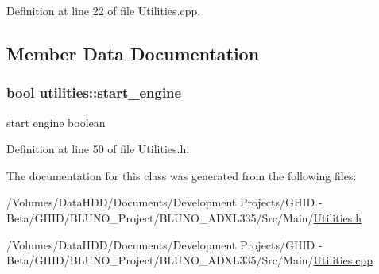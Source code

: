 \-Definition at line 22 of file \-Utilities.\-cpp.



\subsection{\-Member \-Data \-Documentation}
\hypertarget{classutilities_a00ad17c59af67ff895854c2510407513}{
\subsubsection[{start\-\_\-engine}]{\setlength{\rightskip}{0pt plus 5cm}bool {\bf utilities\-::start\-\_\-engine}}}\label{classutilities_a00ad17c59af67ff895854c2510407513}


start engine boolean 



\-Definition at line 50 of file \-Utilities.\-h.



\-The documentation for this class was generated from the following files\-:\begin{DoxyCompactItemize}
\item 
/\-Volumes/\-Data\-H\-D\-D/\-Documents/\-Development Projects/\-G\-H\-I\-D -\/ Beta/\-G\-H\-I\-D/\-B\-L\-U\-N\-O\-\_\-\-Project/\-B\-L\-U\-N\-O\-\_\-\-A\-D\-X\-L335/\-Src/\-Main/\hyperlink{_utilities_8h}{\-Utilities.\-h}\item 
/\-Volumes/\-Data\-H\-D\-D/\-Documents/\-Development Projects/\-G\-H\-I\-D -\/ Beta/\-G\-H\-I\-D/\-B\-L\-U\-N\-O\-\_\-\-Project/\-B\-L\-U\-N\-O\-\_\-\-A\-D\-X\-L335/\-Src/\-Main/\hyperlink{_utilities_8cpp}{\-Utilities.\-cpp}\end{DoxyCompactItemize}
